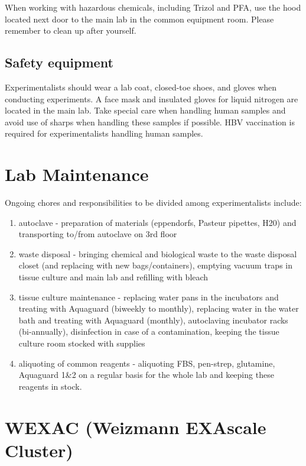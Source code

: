 \documentclass[]{book}
\providecommand{\tightlist}{%
  \setlength{\itemsep}{0pt}\setlength{\parskip}{0pt}}
\begin{document}
When working with hazardous chemicals, including Trizol and PFA, use the
hood located next door to the main lab in the common equipment room.
Please remember to clean up after yourself.

\section{Safety equipment}\label{safety-equipment}

Experimentalists should wear a lab coat, closed-toe shoes, and gloves
when conducting experiments. A face mask and insulated gloves for liquid
nitrogen are located in the main lab. Take special care when handling
human samples and avoid use of sharps when handling these samples if
possible. HBV vaccination is required for experimentalists handling
human samples.

\chapter{Lab Maintenance}\label{labMaintenance}

Ongoing chores and responsibilities to be divided among experimentalists
include:

\begin{enumerate}
\def\labelenumi{\arabic{enumi}.}
\tightlist
\item
  autoclave - preparation of materials (eppendorfs, Pasteur pipettes,
  H20) and transporting to/from autoclave on 3rd floor
\item
  waste disposal - bringing chemical and biological waste to the waste
  disposal closet (and replacing with new bags/containers), emptying
  vacuum traps in tissue culture and main lab and refilling with bleach
\item
  tissue culture maintenance - replacing water pans in the incubators
  and treating with Aquaguard (biweekly to monthly), replacing water in
  the water bath and treating with Aquaguard (monthly), autoclaving
  incubator racks (bi-annually), disinfection in case of a
  contamination, keeping the tissue culture room stocked with supplies
\item
  aliquoting of common reagents - aliquoting FBS, pen-strep, glutamine,
  Aquaguard 1\&2 on a regular basis for the whole lab and keeping these
  reagents in stock.
\end{enumerate}

\chapter{WEXAC (Weizmann EXAscale Cluster)}\label{wexac}
\end{document}
